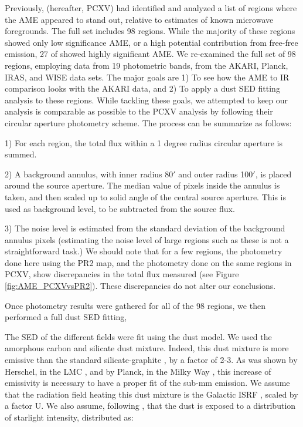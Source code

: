 \documentclass[preprint2,longabstract]{aastex}
\begin{document}
     Previously, \cite{planckXV} (hereafter, PCXV) had identified and analyzed a list of regions where the AME appeared to stand out, relative to estimates of known microwave foregrounds. The full set includes 98 regions. While the majority of these regions showed only low significance AME, or a high potential contribution from free-free emission, 27 of showed highly significant AME. We re-examined the full set of 98 regions, employing data from 19 photometric bands, from the AKARI, Planck, IRAS, and WISE data sets. The major goals are 1) To see how the AME to IR comparison looks with the AKARI data, and 2) To apply a dust SED fitting analysis to these regions. While tackling these goals, we attempted to keep our analysis is comparable as possible to the PCXV analysis by following their circular aperture photometry scheme. The process can be summarize as follows: 
     
     1) For each region, the total flux within a 1 degree radius circular aperture is summed. 
     
     2) A background annulus, with inner radius 80$'$ and outer radius 100$'$, is placed around the source aperture. The median value of pixels inside the annulus is taken, and then scaled up to solid angle of the central source aperture. This is used as background level, to be subtracted from the source flux.
     
     3) The noise level is estimated from the standard deviation of the background annulus pixels (estimating the noise level of large regions such as these is not a straightforward task.) We should note that for a few regions, the photometry done here using the PR2 map, and the photometry done on the same regions in PCXV, show discrepancies in the total flux measured (see Figure \ref{fig:AME_PCXVvsPR2}). These discrepancies do not alter our conclusions.

     Once photometry results were gathered for all of the 98 regions, we then performed a full dust SED fitting, 
     
The SED of the different fields were fit using the \cite{galliano11} dust model. We used the amorphous carbon and silicate dust mixture. Indeed, this dust mixture is more emissive than the standard silicate-graphite \citep{draine07}, by a factor of 2-3. As was shown by Herschel, in the LMC \citep{galliano11}, and by Planck, in the Milky Way \citep{planck16}, this increase of emissivity is necessary to have a proper fit of the sub-mm emission. We assume that the radiation field heating this dust mixture is the Galactic ISRF \citep{math83}, scaled by a factor U. We also assume, following \cite{dale01}, that the dust is exposed to a distribution of starlight intensity, distributed as:
\end{document}
